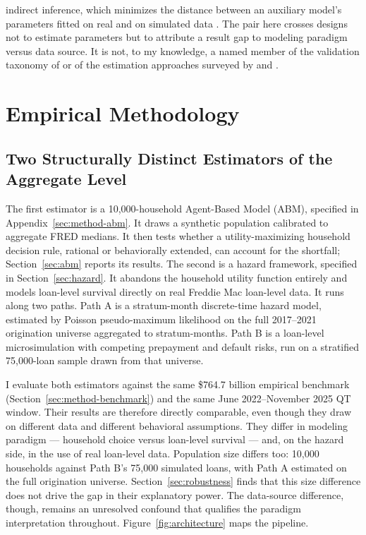\documentclass[12pt]{article}
\begin{document}
indirect inference, which minimizes the distance between an auxiliary model's parameters fitted on real and on simulated data \citep{platt2020}. The pair here crosses designs not to estimate parameters but to attribute a result gap to modeling paradigm versus data source. It is not, to my knowledge, a named member of the validation taxonomy of \citet{fagiolo2007} or of the estimation approaches surveyed by \citet{grazzini2017} and \citet{platt2020}.
\section{Empirical Methodology}\label{sec:method}

\subsection{Two Structurally Distinct Estimators of the Aggregate Level}\label{sec:method-estimators}

The first estimator is a 10,000-household Agent-Based Model (ABM), specified in Appendix~\ref{sec:method-abm}. It draws a synthetic population calibrated to aggregate FRED medians. It then tests whether a utility-maximizing household decision rule, rational or behaviorally extended, can account for the shortfall; Section~\ref{sec:abm} reports its results. The second is a hazard framework, specified in Section~\ref{sec:hazard}. It abandons the household utility function entirely and models loan-level survival directly on real Freddie Mac loan-level data. It runs along two paths. Path A is a stratum-month discrete-time hazard model, estimated by Poisson pseudo-maximum likelihood on the full 2017--2021 origination universe aggregated to stratum-months. Path B is a loan-level microsimulation with competing prepayment and default risks, run on a stratified 75,000-loan sample drawn from that universe.

I evaluate both estimators against the same \$764.7 billion empirical benchmark (Section~\ref{sec:method-benchmark}) and the same June 2022--November 2025 QT window. Their results are therefore directly comparable, even though they draw on different data and different behavioral assumptions. They differ in modeling paradigm --- household choice versus loan-level survival --- and, on the hazard side, in the use of real loan-level data. Population size differs too: 10,000 households against Path B's 75,000 simulated loans, with Path A estimated on the full origination universe. Section~\ref{sec:robustness} finds that this size difference does not drive the gap in their explanatory power. The data-source difference, though, remains an unresolved confound that qualifies the paradigm interpretation throughout. Figure~\ref{fig:architecture} maps the pipeline.
\end{document}
